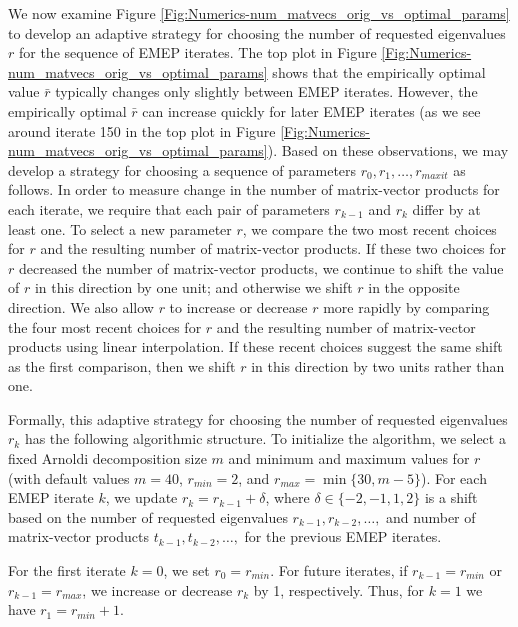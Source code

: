 We now examine Figure \ref{Fig:Numerics-num_matvecs_orig_vs_optimal_params} to develop an adaptive strategy for choosing the number of requested eigenvalues $r$ for the sequence of EMEP iterates.
The top plot in Figure \ref{Fig:Numerics-num_matvecs_orig_vs_optimal_params} shows that the empirically optimal value $\bar{r}$ typically changes only slightly between EMEP iterates.
However, the empirically optimal $\bar{r}$ can increase quickly for later EMEP iterates (as we see around iterate 150 in the top plot in Figure \ref{Fig:Numerics-num_matvecs_orig_vs_optimal_params}).
Based on these observations, we may develop a strategy for choosing a sequence of parameters $r_0, r_1, \ldots, r_{maxit}$ as follows.
In order to measure change in the number of matrix-vector products for each iterate, we require that each pair of parameters $r_{k-1}$ and $r_k$ differ by at least one.
To select a new parameter $r$, we compare the two most recent choices for $r$ and the resulting number of matrix-vector products.
If these two choices for $r$ decreased the number of matrix-vector products, we continue to shift the value of $r$ in this direction by one unit; and otherwise we shift $r$ in the opposite direction.
We also allow $r$ to increase or decrease $r$ more rapidly by comparing the four most recent choices for $r$ and the resulting number of matrix-vector products using linear interpolation.
If these recent choices suggest the same shift as the first comparison, then we shift $r$ in this direction by two units rather than one.



Formally, this adaptive strategy for choosing the number of requested eigenvalues $r_k$ has the following algorithmic structure.
To initialize the algorithm, we select a fixed Arnoldi decomposition size $m$ and minimum and maximum values for $r$ (with default values $m=40$, $r_{min}=2$, and $r_{max} = \min\{ 30, m-5 \}$).
For each EMEP iterate $k$, we update $r_k =  r_{k-1} + \delta$, where $\delta \in \{-2, -1, 1, 2\}$ is a shift based on the number of requested eigenvalues $r_{k-1}, r_{k-2}, \ldots ,$ and number of matrix-vector products $t_{k-1}, t_{k-2}, \ldots ,$ for the previous EMEP iterates.


For the first iterate $k=0$, we set $r_0 = r_{min}$.
For future iterates, if $r_{k-1} = r_{min}$ or $r_{k-1} = r_{max}$, we increase or decrease $r_k$ by 1, respectively.
Thus, for $k=1$ we have $r_1 = r_{min} + 1$.



